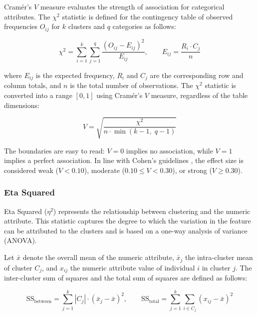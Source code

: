 Cramér's $V$ measure \cite{cramer1946} evaluates the strength of association for categorical attributes. The $\chi^2$ statistic is defined for the contingency table of observed frequencies $O_{ij}$ for $k$ clusters and $q$ categories as follows:

\begin{equation}
    \chi^2 = \sum_{i=1}^{k} \sum_{j=1}^{q} \frac{(O_{ij} - E_{ij})^2}{E_{ij}}, \qquad E_{ij} = \frac{R_i \cdot C_j}{n}
    \label{eq:chisq}
\end{equation}

where $E_{ij}$ is the expected frequency, $R_i$ and $C_j$ are the corresponding row and column totals, and $n$ is the total number of observations. The $\chi^2$ statistic is converted into a range $[0, 1]$ using Cramér's $V$ measure, regardless of the table dimensions:

\begin{equation}
    V = \sqrt{\frac{\chi^2}{n \cdot \min(k-1,\; q-1)}}
    \label{eq:cramer_v}
\end{equation}

The boundaries are easy to read: $V=0$ implies no association, while $V=1$ implies a perfect association. In line with Cohen's guidelines \cite{cohen1988}, the effect size is considered weak ($V<0.10$), moderate ($0.10 \leq V<0.30$), or strong ($V \geq 0.30$).

\subsubsection*{Eta Squared}

Eta Squared ($\eta^2$) represents the relationship between clustering and the numeric attribute. This statistic captures the degree to which the variation in the feature can be attributed to the clusters and is based on a one-way analysis of variance (ANOVA).

Let $\bar{x}$ denote the overall mean of the numeric attribute, $\bar{x}_j$ the intra-cluster mean of cluster $C_j$, and $x_{ij}$ the numeric attribute value of individual $i$ in cluster $j$. The inter-cluster sum of squares and the total sum of squares are defined as follows:

\begin{equation}
    \mathrm{SS}_{\mathrm{between}} = \sum_{j=1}^{k} |C_j| \cdot (\bar{x}_j - \bar{x})^2, \qquad
    \mathrm{SS}_{\mathrm{total}} = \sum_{j=1}^{k} \sum_{i \in C_j} (x_{ij} - \bar{x})^2
    \label{eq:ss}
\end{equation}

